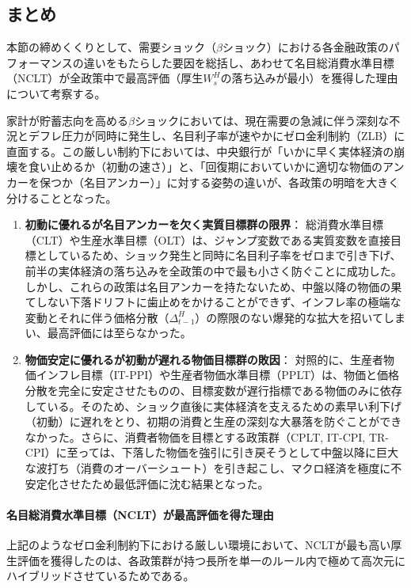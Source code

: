 
\subsection{まとめ}
\label{sec:chapter5_beta_shock_summary}
本節の締めくくりとして、需要ショック（\(\beta\)ショック）における各金融政策のパフォーマンスの違いをもたらした要因を総括し、あわせて名目総消費水準目標（NCLT）が全政策中で最高評価（厚生\(W_s^H\)の落ち込みが最小）を獲得した理由について考察する。

家計が貯蓄志向を高める\(\beta\)ショックにおいては、現在需要の急減に伴う深刻な不況とデフレ圧力が同時に発生し、名目利子率が速やかにゼロ金利制約（ZLB）に直面する。この厳しい制約下においては、中央銀行が「いかに早く実体経済の崩壊を食い止めるか（初動の速さ）」と、「回復期においていかに適切な物価のアンカーを保つか（名目アンカー）」に対する姿勢の違いが、各政策の明暗を大きく分けることとなった。

\begin{enumerate}
    \item
    \label{itm:chapter5_beta_shock_summary_real_target}
        \textbf{初動に優れるが名目アンカーを欠く実質目標群の限界}：
        総消費水準目標（CLT）や生産水準目標（OLT）は、ジャンプ変数である実質変数を直接目標としているため、ショック発生と同時に名目利子率をゼロまで引き下げ、前半の実体経済の落ち込みを全政策の中で最も小さく防ぐことに成功した。しかし、これらの政策は名目アンカーを持たないため、中盤以降の物価の果てしない下落ドリフトに歯止めをかけることができず、インフレ率の極端な変動とそれに伴う価格分散（\(\Delta_{t-1}^H\)）の際限のない爆発的な拡大を招いてしまい、最高評価には至らなかった。
    \item
    \label{itm:chapter5_beta_shock_summary_price_target}
        \textbf{物価安定に優れるが初動が遅れる物価目標群の敗因}：
        対照的に、生産者物価インフレ目標（IT-PPI）や生産者物価水準目標（PPLT）は、物価と価格分散を完全に安定させたものの、目標変数が遅行指標である物価のみに依存している。そのため、ショック直後に実体経済を支えるための素早い利下げ（初動）に遅れをとり、初期の消費と生産の深刻な大暴落を防ぐことができなかった。さらに、消費者物価を目標とする政策群（CPLT, IT-CPI, TR-CPI）に至っては、下落した物価を強引に引き戻そうとして中盤以降に巨大な波打ち（消費のオーバーシュート）を引き起こし、マクロ経済を極度に不安定化させたため最低評価に沈む結果となった。
\end{enumerate}

\paragraph{名目総消費水準目標（NCLT）が最高評価を得た理由}
\label{sec:chapter5_beta_shock_summary_nclt_advantage}
上記のようなゼロ金利制約下における厳しい環境において、NCLTが最も高い厚生評価を獲得したのは、各政策群が持つ長所を単一のルール内で極めて高次元にハイブリッドさせているためである。

